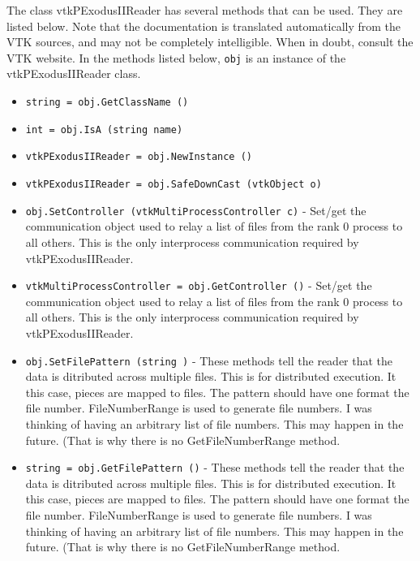 The class vtkPExodusIIReader has several methods that can be used.
  They are listed below.
Note that the documentation is translated automatically from the VTK sources,
and may not be completely intelligible.  When in doubt, consult the VTK website.
In the methods listed below, \verb|obj| is an instance of the vtkPExodusIIReader class.
\begin{itemize}
\item  \verb|string = obj.GetClassName ()|

\item  \verb|int = obj.IsA (string name)|

\item  \verb|vtkPExodusIIReader = obj.NewInstance ()|

\item  \verb|vtkPExodusIIReader = obj.SafeDownCast (vtkObject o)|

\item  \verb|obj.SetController (vtkMultiProcessController c)| -  Set/get the communication object used to relay a list of files
 from the rank 0 process to all others. This is the only interprocess
 communication required by vtkPExodusIIReader.

\item  \verb|vtkMultiProcessController = obj.GetController ()| -  Set/get the communication object used to relay a list of files
 from the rank 0 process to all others. This is the only interprocess
 communication required by vtkPExodusIIReader.

\item  \verb|obj.SetFilePattern (string )| -  These methods tell the reader that the data is ditributed across
 multiple files. This is for distributed execution. It this case,
 pieces are mapped to files. The pattern should have one %
 format the file number. FileNumberRange is used to generate file
 numbers. I was thinking of having an arbitrary list of file
 numbers. This may happen in the future. (That is why there is no
 GetFileNumberRange method.

\item  \verb|string = obj.GetFilePattern ()| -  These methods tell the reader that the data is ditributed across
 multiple files. This is for distributed execution. It this case,
 pieces are mapped to files. The pattern should have one %
 format the file number. FileNumberRange is used to generate file
 numbers. I was thinking of having an arbitrary list of file
 numbers. This may happen in the future. (That is why there is no
 GetFileNumberRange method.


\end{itemize}
